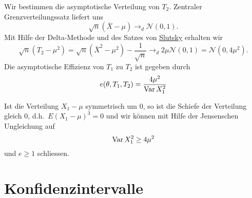 Wir bestimmen die asymptotische Verteilung von $T_2$. Zentraler Grenzverteilungssatz liefert uns
\begin{equation*}
    \sqrt{n}\left( \bar X - \mu \right) \to_d \mathcal N(0,1).
\end{equation*}
Mit Hilfe der Delta-Methode und des Satzes von
\href{http://books.google.de/books?id=6anRT6Cz5GAC&lpg=PA101&dq=Slutsky's%20theorem&hl=de&pg=PA101#v=onepage&q&f=false}{Slutsky}
erhalten wir
\begin{equation*}
    \sqrt{n}\left( T_2 - \mu^2 \right) =
    \sqrt{n}\left( {\bar X}^2 - \mu^2 \right) - \frac{1}{\sqrt{n}} \to_d 
    2\mu \mathcal N(0,1) = \mathcal N(0, 4\mu^2).
\end{equation*}
Die asymptotische Effizienz von $T_1$ zu $T_2$ ist gegeben durch
\begin{equation*}
    e(\theta, T_1, T_2) = \frac{4\mu^2}{\operatorname{Var} X_1^2}
\end{equation*}

Ist die Verteilung $X_1 - \mu$ symmetrisch um $0$, so ist die Schiefe der Verteilung
gleich $0$, d.h.\ $E \left( X_1 -\mu \right)^3=0$ und wir können mit Hilfe der
Jensenschen Ungleichung auf
\begin{equation*}
    \operatorname{Var} X_1^2 \geq 4 \mu^2
\end{equation*}
und $e\geq 1$ schliessen.






\section{Konfidenzintervalle}

